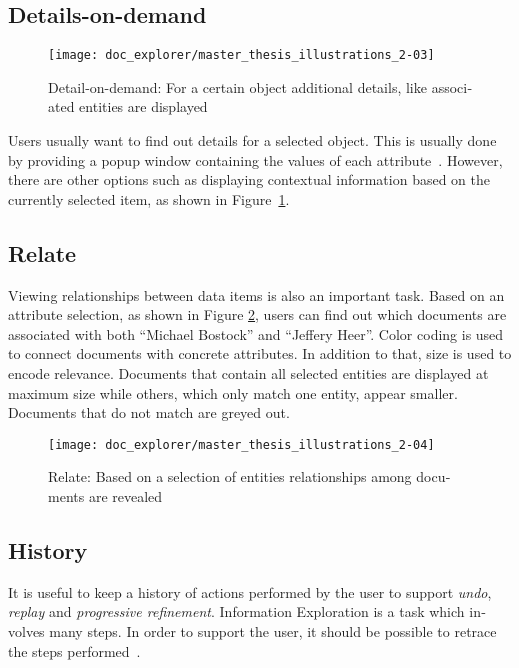 \begin{english}
\subsection{Details-on-demand}

\begin{figure}
\centering
\texttt{[image: doc\_explorer/master\_thesis\_illustrations\_2-03]}
\caption{Detail-on-demand: For a certain object additional details, like associated entities are displayed}
\label{fig:detail}
\end{figure}

Users usually want to find out details for a selected object. This is usually done by providing a popup window containing the values of each attribute~\cite{shneiderman96eyes}. However, there are other options such as displaying contextual information based on the currently selected item, as shown in Figure~\ref{fig:detail}.


\subsection{Relate}

Viewing relationships between data items is also an important task. Based on an attribute selection, as shown in Figure \ref{fig:relate}, users can find out which documents are associated with both ``Michael Bostock'' and ``Jeffery Heer''. Color coding is used to connect documents with concrete attributes. In addition to that, size is used to encode relevance. Documents that contain all selected entities are displayed at maximum size while others, which only match one entity, appear smaller. Documents that do not match are greyed out.

\begin{figure}
\centering
\texttt{[image: doc\_explorer/master\_thesis\_illustrations\_2-04]}
\caption{Relate: Based on a selection of entities relationships among documents are revealed}
\label{fig:relate}
\end{figure}


\subsection{History}

It is useful to keep a history of actions performed by the user to support \emph{undo}, \emph{replay} and \emph{progressive refinement}. Information Exploration is a task which involves many steps. In order to support the user, it should be possible to retrace the steps performed~\cite{shneiderman96eyes}.



\end{english}

